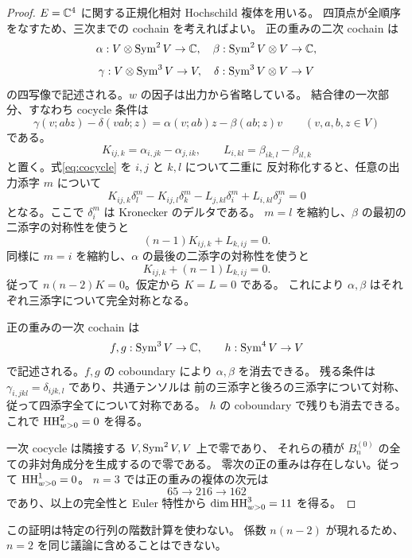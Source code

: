 \begin{proof}
$E=\mathbb C^4$ に関する正規化相対 Hochschild 複体を用いる。
四頂点が全順序をなすため、三次までの cochain を考えればよい。
正の重みの二次 cochain は
\[
 \alpha:V\otimes\operatorname{Sym}^2V\to\mathbb C,\quad
 \beta:\operatorname{Sym}^2V\otimes V\to\mathbb C,
\]
\[
 \gamma:V\otimes\operatorname{Sym}^3V\to V,\quad
 \delta:\operatorname{Sym}^3V\otimes V\to V
\]
の四写像で記述される。$w$ の因子は出力から省略している。
結合律の一次部分、すなわち cocycle 条件は
\begin{equation}\label{eq:cocycle}
 \gamma(v;abz)-\delta(vab;z)
 =\alpha(v;ab)z-\beta(ab;z)v
 \qquad(v,a,b,z\in V)
\end{equation}
である。
\[
 K_{ij,k}=\alpha_{i,jk}-\alpha_{j,ik},\qquad
 L_{i,kl}=\beta_{ik,l}-\beta_{il,k}
\]
と置く。式\eqref{eq:cocycle} を $i,j$ と $k,l$ について二重に
反対称化すると、任意の出力添字 $m$ について
\begin{equation}\label{eq:antisym}
 K_{ij,k}\delta_l^m-K_{ij,l}\delta_k^m
 -L_{j,kl}\delta_i^m+L_{i,kl}\delta_j^m=0
\end{equation}
となる。ここで $\delta_i^m$ は Kronecker のデルタである。
$m=l$ を縮約し、$\beta$ の最初の二添字の対称性を使うと
\[
 (n-1)K_{ij,k}+L_{k,ij}=0.
\]
同様に $m=i$ を縮約し、$\alpha$ の最後の二添字の対称性を使うと
\[
 K_{ij,k}+(n-1)L_{k,ij}=0.
\]
従って $n(n-2)K=0$。仮定から $K=L=0$ である。
これにより $\alpha,\beta$ はそれぞれ三添字について完全対称となる。

正の重みの一次 cochain は
\[
 f,g:\operatorname{Sym}^3V\to\mathbb C,\qquad h:\operatorname{Sym}^4V\to V
\]
で記述される。$f,g$ の coboundary により $\alpha,\beta$ を消去できる。
残る条件は $\gamma_{i,jkl}=\delta_{ijk,l}$ であり、共通テンソルは
前の三添字と後ろの三添字について対称、従って四添字全てについて対称である。
$h$ の coboundary で残りも消去できる。これで $\operatorname{HH}^2_{w>0}=0$ を得る。

一次 cocycle は隣接する $V,\operatorname{Sym}^2V,V$ 上で零であり、
それらの積が $B_n^{(0)}$ の全ての非対角成分を生成するので零である。
零次の正の重みは存在しない。従って $\operatorname{HH}^1_{w>0}=0$。
$n=3$ では正の重みの複体の次元は
\[
 65\longrightarrow216\longrightarrow162
\]
であり、以上の完全性と Euler 特性から $\dim\operatorname{HH}^3_{w>0}=11$ を得る。
\end{proof}

\begin{remark}
この証明は特定の行列の階数計算を使わない。
係数 $n(n-2)$ が現れるため、$n=2$ を同じ議論に含めることはできない。
\end{remark}



